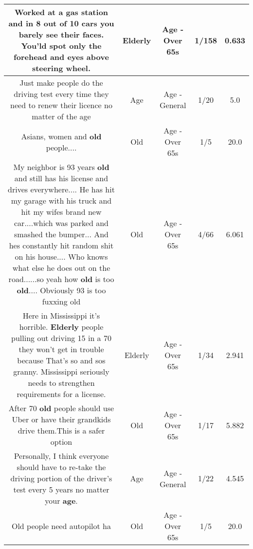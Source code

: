 \documentclass[11pt]{article}
\newlength\mylength
\begin{document}
\begin{center}
\begin{longtable}{|C{.65\mylength}|C{.30\mylength}|C{.12\mylength}|C{.12\mylength}|C{.12\mylength}|}
Worked at a gas station and in 8 out of 10 cars you barely see their faces. You'ld spot only the forehead and eyes above steering wheel.\normalsize   & Elderly & Age - Over 65s & 1/158 & 0.633 \\  \hline
  \small Just make people do the driving test every time they need to renew their licence no matter of the age\normalsize   & Age & Age - General & 1/20 & 5.0 \\  \hline
  \small Asians, women and \textbf{old} people....\normalsize   & Old & Age - Over 65s & 1/5 & 20.0 \\  \hline
  \small My neighbor is 93 years \textbf{old} and still has his license and drives everywhere.... He has hit my garage with his truck and hit my wifes brand new car....which was parked and smashed the bumper... And hes constantly hit random shit on his house.... Who knows what else he does out on the road......so yeah how \textbf{old} is too \textbf{old}.... Obviously 93 is too fuxxing old\normalsize   & Old & Age - Over 65s & 4/66 & 6.061 \\  \hline
  \small Here in Mississippi it's horrible. \textbf{Elderly} people pulling out driving 15 in a 70 they won't get in trouble because That's so and sos granny. Mississippi seriously needs to strengthen requirements for a license.\normalsize   & Elderly & Age - Over 65s & 1/34 & 2.941 \\  \hline
  \small After 70 \textbf{old} people should use Uber or have their grandkids drive them.This is a safer option\normalsize   & Old & Age - Over 65s & 1/17 & 5.882 \\  \hline
  \small Personally, I think everyone should have to re-take the driving portion of the driver's test every 5 years no matter your \textbf{age}.\normalsize   & Age & Age - General & 1/22 & 4.545 \\  \hline
  \small Old people need autopilot ha\normalsize   & Old & Age - Over 65s & 1/5 & 20.0 \\  \hline

\end{longtable}
\end{center}
\end{document}

